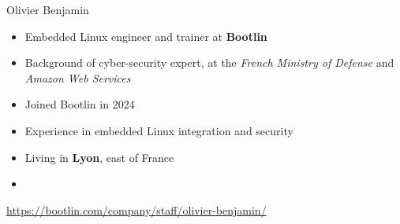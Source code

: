 \begin{frame}{Olivier Benjamin}
  \begin{itemize}
  \item Embedded Linux engineer and trainer at {\bf Bootlin}
  \item Background of cyber-security expert, at the {\em French
    Ministry of Defense} and {\em Amazon Web Services}
  \item Joined Bootlin in 2024
  \item Experience in embedded Linux integration and security
  \item Living in {\bf Lyon}, east of France
  \item {}
  \end{itemize}
  {\small \url{https://bootlin.com/company/staff/olivier-benjamin/}}
\end{frame}
